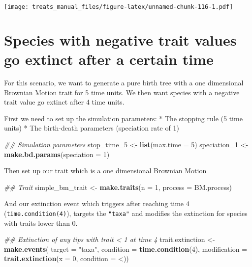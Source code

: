 \documentclass[
]{book}
\newenvironment{Shaded}{\begin{snugshade}}{\end{snugshade}}
\newcommand{\CommentTok}[1]{\textcolor[rgb]{0.56,0.35,0.01}{\textit{#1}}}
\newcommand{\DataTypeTok}[1]{\textcolor[rgb]{0.13,0.29,0.53}{#1}}
\newcommand{\DecValTok}[1]{\textcolor[rgb]{0.00,0.00,0.81}{#1}}
\newcommand{\KeywordTok}[1]{\textcolor[rgb]{0.13,0.29,0.53}{\textbf{#1}}}
\newcommand{\NormalTok}[1]{#1}
\newcommand{\StringTok}[1]{\textcolor[rgb]{0.31,0.60,0.02}{#1}}
\begin{document}
\texttt{[image: treats\_manual\_files/figure-latex/unnamed-chunk-116-1.pdf]}

\hypertarget{EGneg_ext}{%
\section{Species with negative trait values go extinct after a certain time}\label{EGneg_ext}}

For this scenario, we want to generate a pure birth tree with a one dimensional Brownian Motion trait for 5 time units.
We then want species with a negative trait value go extinct after 4 time units.

First we need to set up the simulation parameters:
* The stopping rule (5 time units)
* The birth-death parameters (speciation rate of 1)

\begin{Shaded}
\begin{Highlighting}[]
\CommentTok{\#\# Simulation parameters}
\NormalTok{stop\_time\_}\DecValTok{5}\NormalTok{ \textless{}{-}}\StringTok{ }\KeywordTok{list}\NormalTok{(}\DataTypeTok{max.time =} \DecValTok{5}\NormalTok{)}
\NormalTok{speciation\_}\DecValTok{1}\NormalTok{ \textless{}{-}}\StringTok{ }\KeywordTok{make.bd.params}\NormalTok{(}\DataTypeTok{speciation =} \DecValTok{1}\NormalTok{)}
\end{Highlighting}
\end{Shaded}

Then set up our trait which is a one dimensional Brownian Motion

\begin{Shaded}
\begin{Highlighting}[]
\CommentTok{\#\# Trait}
\NormalTok{simple\_bm\_trait \textless{}{-}}\StringTok{ }\KeywordTok{make.traits}\NormalTok{(}\DataTypeTok{n =} \DecValTok{1}\NormalTok{, }\DataTypeTok{process =}\NormalTok{ BM.process)}
\end{Highlighting}
\end{Shaded}

And our extinction event which triggers after reaching time 4 (\texttt{time.condition(4)}), targets the \texttt{"taxa"} and modifies the extinction for species with traits lower than 0.

\begin{Shaded}
\begin{Highlighting}[]
\CommentTok{\#\# Extinction of any tips with trait \textless{} 1 at time 4}
\NormalTok{trait.extinction \textless{}{-}}\StringTok{ }\KeywordTok{make.events}\NormalTok{(}
                      \DataTypeTok{target =} \StringTok{"taxa"}\NormalTok{,}
                      \DataTypeTok{condition =} \KeywordTok{time.condition}\NormalTok{(}\DecValTok{4}\NormalTok{),}
                      \DataTypeTok{modification =} \KeywordTok{trait.extinction}\NormalTok{(}\DataTypeTok{x =} \DecValTok{0}\NormalTok{,}
                                                      \DataTypeTok{condition =} \StringTok{\textasciigrave{}}\DataTypeTok{\textless{}}\StringTok{\textasciigrave{}}\NormalTok{))}
\end{Highlighting}
\end{Shaded}
\end{document}
